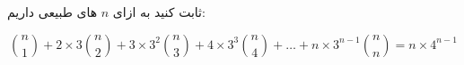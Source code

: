 \p    
ثابت کنید به ازای
 $n$
 ‌‌‌های
 ‌طبیعی داریم:

 \[
   \binom{n}{1} + 2\times3\binom{n}{2} + 3\times3^2\binom{n}{3} + 4\times3^3\binom{n}{4} +\ldots +
    n\times3^{n-1}\binom{n}{n} = n\times4^{n-1}
\]
